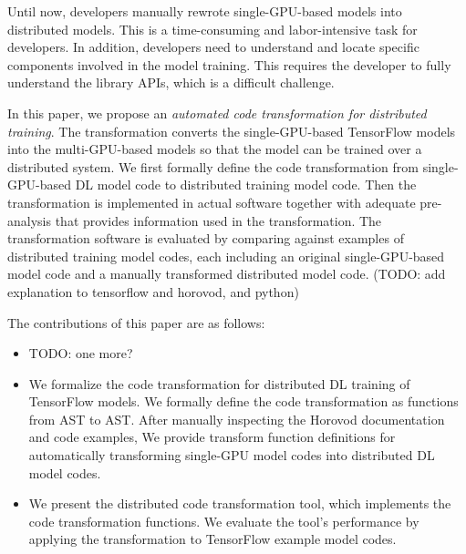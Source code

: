 Until now, developers manually rewrote single-GPU-based models
into distributed models.
This is a time-consuming and labor-intensive task for developers.
In addition, developers need to understand and locate 
specific components involved in the model training.
This requires the developer to fully understand the library APIs,
which is a difficult challenge.

In this paper, we propose an 
\textit{automated code transformation for distributed training}.
The transformation
converts the single-GPU-based TensorFlow models
into the multi-GPU-based models so that the model can be trained
over a distributed system.
We first formally define the code transformation from
single-GPU-based DL model code to distributed training model code.
Then the transformation is implemented in actual software together with
adequate pre-analysis that provides information used in the transformation.
The transformation software is evaluated by comparing against 
examples of distributed training model codes, 
each including an original single-GPU-based model code 
and a manually transformed distributed model code.
(TODO: add explanation to tensorflow and horovod, and python)

The contributions of this paper are as follows:

\begin{itemize}
  \item TODO: one more?

  \item We formalize the code transformation for distributed DL training
        of TensorFlow models. We formally define the code transformation
        as functions from AST to AST. After manually inspecting
        the Horovod documentation and code examples,
        We provide transform function definitions for 
        automatically transforming single-GPU model codes into
        distributed DL model codes.

  \item We present the distributed code transformation tool, which implements
        the code transformation functions. We evaluate the tool's performance
        by applying the transformation to TensorFlow example model codes.
\end{itemize}
